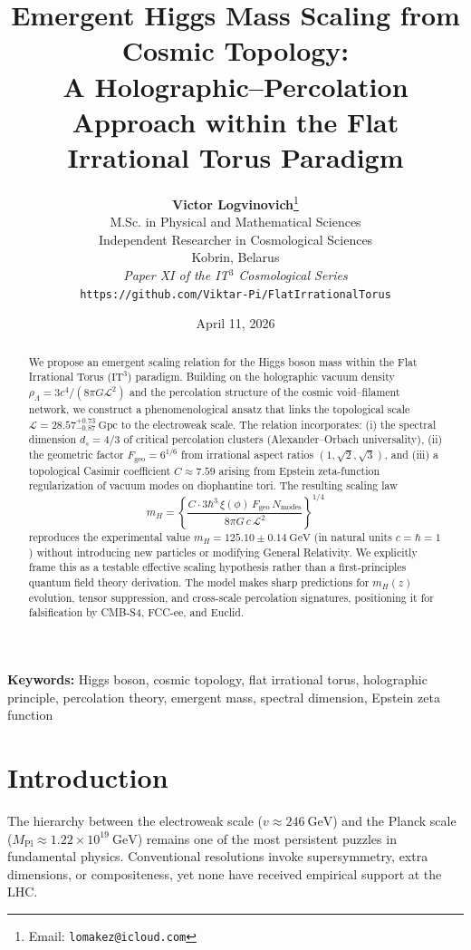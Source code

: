 \documentclass[11pt,a4paper]{article}
\title{
    \vspace{-2em}
    \textbf{Emergent Higgs Mass Scaling from Cosmic Topology:}\\
    \large A Holographic--Percolation Approach within the Flat Irrational Torus Paradigm
    \vspace{0.5em}
}
\author{
    \textbf{Victor Logvinovich}\thanks{Email: \texttt{lomakez@icloud.com}}\\
    \small M.Sc. in Physical and Mathematical Sciences\\
    \small Independent Researcher in Cosmological Sciences\\
    \small Kobrin, Belarus\\[1em]
    \small \textit{Paper XI of the IT$^3$ Cosmological Series}\\
    \small \texttt{https://github.com/Viktar-Pi/FlatIrrationalTorus}
}
\date{April 11, 2026}
\newcommand{\ITthree}{\ensuremath{\mathrm{IT}^3}}
\newcommand{\Ltop}{\ensuremath{\mathcal{L}}}
\newcommand{\rhoLambda}{\ensuremath{\rho_\Lambda}}
\newcommand{\xiPhi}{\ensuremath{\xi(\phi)}}
\newcommand{\Fgeo}{\ensuremath{F_{\mathrm{geo}}}}
\newcommand{\Nmodes}{\ensuremath{N_{\mathrm{modes}}}}
\begin{document}
\maketitle

\begin{abstract}
\noindent
We propose an emergent scaling relation for the Higgs boson mass within the Flat 
Irrational Torus ($\ITthree$) paradigm. Building on the holographic vacuum density 
$\rhoLambda = 3c^4/(8\pi G \Ltop^2)$ and the percolation structure of the cosmic 
void--filament network, we construct a phenomenological ansatz that links the 
topological scale $\Ltop = 28.57^{+0.73}_{-0.87}~\mathrm{Gpc}$ to the 
electroweak scale. The relation incorporates: (i) the spectral dimension 
$d_s = 4/3$ of critical percolation clusters (Alexander--Orbach universality), 
(ii) the geometric factor $\Fgeo = 6^{1/6}$ from irrational aspect ratios 
$(1,\sqrt{2},\sqrt{3})$, and (iii) a topological Casimir coefficient 
$C \approx 7.59$ arising from Epstein zeta-function regularization of vacuum 
modes on diophantine tori. The resulting scaling law
\[
m_H = \left\{ \frac{C \cdot 3\hbar^3 \, \xiPhi \, \Fgeo \, \Nmodes}{8\pi G \, c \, \Ltop^2} \right\}^{1/4}
\]
reproduces the experimental value $m_H = 125.10 \pm 0.14~\mathrm{GeV}$ 
(in natural units $c=\hbar=1$) without introducing new particles or modifying 
General Relativity. We explicitly frame this as a testable effective scaling 
hypothesis rather than a first-principles quantum field theory derivation. 
The model makes sharp predictions for $m_H(z)$ evolution, tensor suppression, 
and cross-scale percolation signatures, positioning it for falsification by 
CMB-S4, FCC-ee, and Euclid.
\end{abstract}

\textbf{Keywords:} Higgs boson, cosmic topology, flat irrational torus, holographic principle, percolation theory, emergent mass, spectral dimension, Epstein zeta function

\section{Introduction}
\label{sec:intro}

The hierarchy between the electroweak scale ($v \approx 246~\mathrm{GeV}$) 
and the Planck scale ($M_{\mathrm{Pl}} \approx 1.22 \times 10^{19}~\mathrm{GeV}$) 
remains one of the most persistent puzzles in fundamental physics. Conventional 
resolutions invoke supersymmetry, extra dimensions, or compositeness, yet none 
have received empirical support at the LHC.
\end{document}
